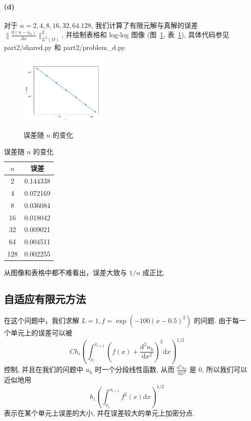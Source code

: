 \documentclass[UTF8]{article}
\begin{document}
    \paragraph{(d)}
    对于 $n = 2,4,8,16,32,64.128$, 我们计算了有限元解与真解的误差 $\lVert \frac{\textrm{d}(u-u_h)}{\textrm{d}x} \rVert^2_{L^2(\Omega)}$, 并绘制表格和 log-log 图像 (图~\ref{fig:figure2}, 表~\ref{tab:table1}), 具体代码参见 part2/shared.py 和 part2/problem\_d.py.

    \begin{figure}
        \centering
        \caption{误差随 $n$ 的变化}
        \includegraphics[width=0.4\textwidth]{./assets/fig1}
        \label{fig:figure2}
    \end{figure}

    \begin{table}
        \centering
        \caption{误差随 $n$ 的变化}
        \begin{tabular}{|c|c|}
            \hline
            $n$ & 误差       \\
            \hline
            2   & 0.144338 \\
            4   & 0.072169 \\
            8   & 0.036084 \\
            16  & 0.018042 \\
            32  & 0.009021 \\
            64  & 0.004511 \\
            128 & 0.002255 \\
            \hline
        \end{tabular}
        \label{tab:table1}
    \end{table}

    从图像和表格中都不难看出，误差大致与 $1/n$ 成正比.

    \subsection{自适应有限元方法}

    在这个问题中，我们求解 $L=1, f=\exp(-100 (x-0.5)^2)$ 的问题.
    由于每一个单元上的误差可以被
    \[
        Ch_i\left( \int_{x_i}^{x_{i+1}} \left( f(x)+ \frac{\textrm{d}^2 u_h}{\textrm{d}x^2}\right)^2 \textrm{d}x \right)^{1/2}
    \]
    控制, 并且在我们的问题中 $u_h$ 时一个分段线性函数, 从而 $\frac{\textrm{d}^2 u_h}{\textrm{d}x^2}$ 是 0, 所以我们可以近似地用
    \[
        h_i\left( \int_{x_i}^{x_{i+1}} f^2(x)\textrm{d}x \right)^{1/2}
    \]
    表示在某个单元上误差的大小, 并在误差较大的单元上加密分点.
\end{document}
